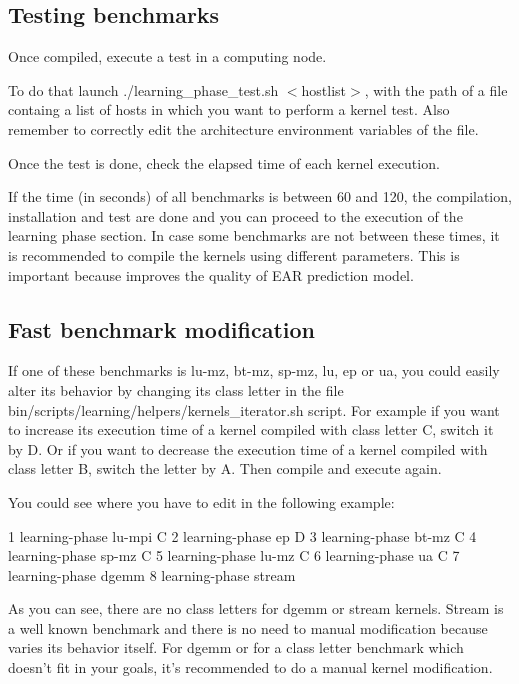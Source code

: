 \subsection*{Testing benchmarks }

Once compiled, execute a test in a computing node.

To do that launch {\ttfamily ./learning\+\_\+phase\+\_\+test.sh $<$hostlist$>$}, with the path of a file containg a list of hosts in which you want to perform a kernel test. Also remember to correctly edit the architecture environment variables of the file.

Once the test is done, check the elapsed time of each kernel execution.

If the time (in seconds) of all benchmarks is between 60 and 120, the compilation, installation and test are done and you can proceed to the execution of the learning phase section. In case some benchmarks are not between these times, it is recommended to compile the kernels using different parameters. This is important because improves the quality of E\+AR prediction model.

\subsection*{Fast benchmark modification }

If one of these benchmarks is {\ttfamily lu-\/mz}, {\ttfamily bt-\/mz}, {\ttfamily sp-\/mz}, {\ttfamily lu}, {\ttfamily ep} or {\ttfamily ua}, you could easily alter its behavior by changing its class letter in the file {\ttfamily bin/scripts/learning/helpers/kernels\+\_\+iterator.\+sh} script. For example if you want to increase its execution time of a kernel compiled with class letter C, switch it by D. Or if you want to decrease the execution time of a kernel compiled with class letter B, switch the letter by A. Then compile and execute again.

You could see where you have to edit in the following example\+: 
\begin{DoxyCode}
1 learning-phase lu-mpi C
2 learning-phase ep D
3 learning-phase bt-mz C
4 learning-phase sp-mz C
5 learning-phase lu-mz C
6 learning-phase ua C
7 learning-phase dgemm
8 learning-phase stream
\end{DoxyCode}
 As you can see, there are no class letters for {\ttfamily dgemm} or {\ttfamily stream} kernels. Stream is a well known benchmark and there is no need to manual modification because varies its behavior itself. For {\ttfamily dgemm} or for a class letter benchmark which doesn’t fit in your goals, it’s recommended to do a manual kernel modification.

